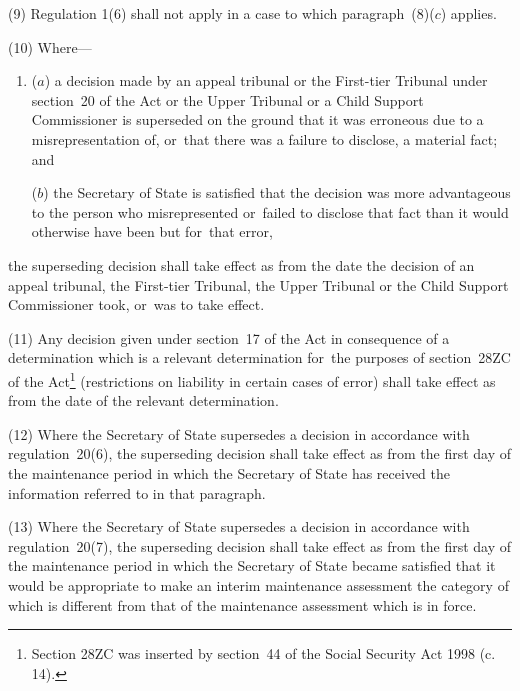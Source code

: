 \documentclass[a4paper,12pt]{article}
\begin{document}
(9) Regulation 1(6) shall not apply in a case to which paragraph~(8)($c$) applies.

(10) Where---
\begin{enumerate}\item[]
($a$) a decision made by 
an appeal tribunal or the First-tier Tribunal under section~20 of the Act or the Upper Tribunal or a Child Support Commissioner  %
is superseded on the ground that it was erroneous due to a misrepresentation of, or~that there was a failure to disclose, a material fact; and

($b$) the Secretary of State is satisfied that the decision was more advantageous to the person who misrepresented or~failed to disclose that fact than it would otherwise have been but for~that error,
\end{enumerate}
the superseding decision shall take effect as from the date the decision of 
an appeal tribunal, the First-tier Tribunal, the Upper Tribunal or the Child Support Commissioner  %
took, or~was to take effect.

(11) Any decision given under section~17 of the Act in consequence of a determination which is a relevant determination for~the purposes of section~28ZC of the Act\footnote{\frenchspacing Section 28ZC was inserted by section~44 of the Social Security Act 1998 (c. 14).} (restrictions on liability in certain cases of error) shall take effect as from the date of the relevant determination.

(12) Where the Secretary of State supersedes a decision in accordance with regulation~20(6), the superseding decision shall take effect as from the first day of the maintenance period in which the Secretary of State has received the information referred to in that paragraph.

(13) Where the Secretary of State supersedes a decision in accordance with regulation~20(7), the superseding decision shall take effect as from the first day of the maintenance period in which the Secretary of State became satisfied that it would be appropriate to make an interim maintenance assessment the category of which is different from that of the maintenance assessment which is in force.
\end{document}
